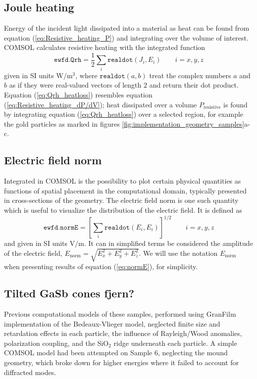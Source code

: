 \subsection{Joule heating}
Energy of the incident light dissipated into a material as heat can be found from equation (\ref{eq:Resistive_heating_P}) and integrating over the volume of interest. COMSOL calculates resistive heating with the integrated function 
\begin{equation}
    \texttt{ewfd.Qrh} = \frac{1}{2}\sum_i \texttt{realdot}(J_i,E_i) \quad\quad i=x,y,z
    \label{eq:Qrh_heatloss}
\end{equation}
given in SI units W$/$m$^3$, where $\texttt{realdot}(a,b)$ treat the complex numbers $a$ and $b$ as if they were real-valued vectors of length $2$ and return their dot product\cite{comsol_referencemanual}. Equation (\ref{eq:Qrh_heatloss}) resembles equation (\ref{eq:Resistive_heating_dP/dV}); heat dissipated over a volume $P_{\text{resistive}}$ is found by integrating equation (\ref{eq:Qrh_heatloss}) over a selected region, for example the gold particles as marked in figures \ref{fig:implementation_geometry_samples}a-c.

\subsection{Electric field norm}
Integrated in COMSOL is the possibility to plot certain physical quantities as functions of spatial placement in the computational domain, typically presented in cross-sections of the geometry. The electric field norm is one such quantity which is useful to visualize the distribution of the electric field. It is defined as
\begin{equation}
    \texttt{ewfd.normE} = \left [ \sum_i \texttt{realdot}(E_i,E_i) \right ]^{1/2} \quad\quad i=x,y,z
    \label{eq:normE}
\end{equation}
and given in SI units V$/$m. It can in simplified terms be considered the amplitude of the electric field, $E_\text{norm}=\sqrt{E_x^2+E_y^2+E_z^2}$. We will use the notation $E_\text{norm}$ when presenting results of equation (\ref{eq:normE}), for simplicity.
\subsection{Tilted GaSb cones \color{red}fjern?}
\label{sec:implementation_gasb_cones}


Previous computational models of these samples, performed using GranFilm implementation of the Bedeaux-Vlieger model, neglected finite size and retardation effects in each particle, the influence of Rayleigh/Wood anomalies, polarization coupling, and the SiO$_2$ ridge underneath each particle. A simple COMSOL model had been attempted on Sample 6, neglecting the mound geometry, which broke down for higher energies where it failed to account for diffracted modes.

